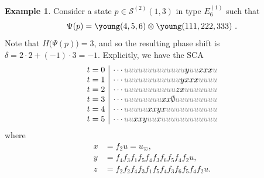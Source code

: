 \documentclass[reqno]{amsart}
\newcommand{\Sol}{\mathcal{S}} %
\theoremstyle{plain}
\theoremstyle{definition}
\newtheorem{ex}[thm]{Example}
\numberwithin{equation}{section}
\begin{document}
\begin{ex}
\label{ex:SCA_E_6_neg_shift}
Consider a state $p \in \Sol^{(2)}(1, 3)$ in type $E_6^{(1)}$ such that
\[
\Psi(p) = \young(4,5,6) \otimes \young(111,222,333)\ .
\]
Note that $H\bigl(\Psi(p)\bigr) = 3$, and so the resulting phase shift is $\delta = 2 \cdot 2 + (-1) \cdot 3 = -1$.
Explicitly, we have the SCA
\[
{\begin{array}{c|c}
t = 0 & \cdots {\color{gray} u} {\color{gray} u} {\color{gray} u} {\color{gray} u} {\color{gray} u} {\color{gray} u} {\color{gray} u} {\color{gray} u} {\color{gray} u} {\color{gray} u} {\color{gray} u} {\color{gray} u} {\color{gray} u} y {\color{gray} u} {\color{gray} u} x x x {\color{gray} u} \\
t = 1 & \cdots {\color{gray} u} {\color{gray} u} {\color{gray} u} {\color{gray} u} {\color{gray} u} {\color{gray} u} {\color{gray} u} {\color{gray} u} {\color{gray} u} {\color{gray} u} {\color{gray} u} {\color{gray} u} y x x x {\color{gray} u} {\color{gray} u} {\color{gray} u} {\color{gray} u} \\
t = 2 & \cdots {\color{gray} u} {\color{gray} u} {\color{gray} u} {\color{gray} u} {\color{gray} u} {\color{gray} u} {\color{gray} u} {\color{gray} u} {\color{gray} u} {\color{gray} u} {\color{gray} u} z x {\color{gray} u} {\color{gray} u} {\color{gray} u} {\color{gray} u} {\color{gray} u} {\color{gray} u} {\color{gray} u} \\
t = 3 & \cdots {\color{gray} u} {\color{gray} u} {\color{gray} u} {\color{gray} u} {\color{gray} u} {\color{gray} u} {\color{gray} u} {\color{gray} u} x x \emptyset {\color{gray} u} {\color{gray} u} {\color{gray} u} {\color{gray} u} {\color{gray} u} {\color{gray} u} {\color{gray} u} {\color{gray} u} {\color{gray} u} \\
t = 4 & \cdots {\color{gray} u} {\color{gray} u} {\color{gray} u} {\color{gray} u} {\color{gray} u} x x y x {\color{gray} u} {\color{gray} u} {\color{gray} u} {\color{gray} u} {\color{gray} u} {\color{gray} u} {\color{gray} u} {\color{gray} u} {\color{gray} u} {\color{gray} u} {\color{gray} u} \\
t = 5 & \cdots {\color{gray} u} {\color{gray} u} x x y {\color{gray} u} {\color{gray} u} x {\color{gray} u} {\color{gray} u} {\color{gray} u} {\color{gray} u} {\color{gray} u} {\color{gray} u} {\color{gray} u} {\color{gray} u} {\color{gray} u} {\color{gray} u} {\color{gray} u} {\color{gray} u}
\end{array}}
\]
where
\begin{align*}
x & = f_2 u = u_{\varpi},
\\ y & = f_4 f_3 f_1 f_5 f_4 f_3 f_6 f_5 f_4 f_2 u,
\\ z & = f_2 f_2 f_4 f_3 f_1 f_5 f_4 f_3 f_6 f_5 f_4 f_2 u.
\end{align*}
\end{ex}
\end{document}
